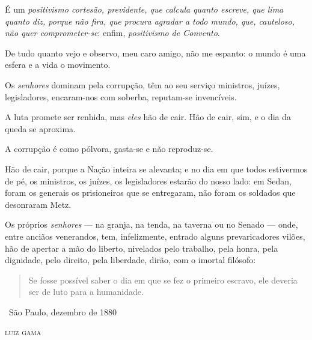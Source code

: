 {É um \emph{positivismo cortesão, previdente, que calcula quanto escreve,
que lima quanto diz, porque não fira, que procura agradar a todo mundo,
que, cauteloso, não quer comprometer-se}: enfim, \emph{positivismo de
Convento}.

De tudo quanto vejo e observo, meu caro amigo, não me espanto: o mundo é
uma esfera e a vida o movimento.

Os \emph{senhores} dominam pela corrupção, têm ao seu serviço ministros,
juízes, legisladores, encaram-nos com soberba, reputam-se invencíveis.

A luta promete ser renhida, mas \emph{eles} hão de cair. Hão de cair,
sim, e o dia da queda se aproxima.

A corrupção é como pólvora, gasta-se e não reproduz-se.

Hão de cair, porque a Nação inteira se alevanta; e no dia em que todos
estivermos de pé, os ministros, os juízes, os legisladores estarão do
nosso lado: em Sedan, foram os generais os prisioneiros que se
entregaram, não foram os soldados que desonraram Metz.

Os próprios \emph{senhores} --- na granja, na tenda, na taverna ou no
Senado --- onde, entre anciãos venerandos, tem, infelizmente, entrado
alguns prevaricadores vilões, hão de apertar a mão do liberto, nivelados
pelo trabalho, pela honra, pela dignidade, pelo direito, pela liberdade,
dirão, com o imortal filósofo:

\begin{quote}
Se fosse possível saber o dia em que se fez o primeiro escravo,
ele deveria ser de luto para a humanidade.
\end{quote}

\medskip

\hfill\ São Paulo, dezembro de 1880

\hfill\textsc{luiz gama}


}
